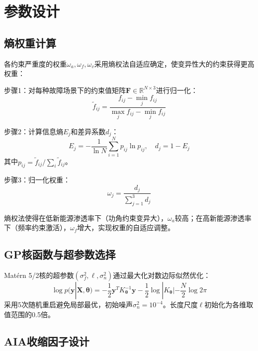 \section{参数设计}
\label{sec:parameters}

\subsection{熵权重计算}

各约束严重度的权重$\omega_a, \omega_f, \omega_v$采用熵权法自适应确定，使变异性大的约束获得更高权重：

步骤1：对每种故障场景下的约束值矩阵$\mathbf{F} \in \mathbb{R}^{N \times 3}$进行归一化：
\begin{equation}
    \tilde{f}_{ij} = \frac{f_{ij} - \min_j f_{ij}}{\max_j f_{ij} - \min_j f_{ij}}
    \label{eq:normalize}
\end{equation}

步骤2：计算信息熵$E_j$和差异系数$d_j$：
\begin{equation}
    E_j = -\frac{1}{\ln N} \sum_{i=1}^N p_{ij} \ln p_{ij}, \quad d_j = 1 - E_j
    \label{eq:entropy}
\end{equation}
其中$p_{ij} = \tilde{f}_{ij} / \sum_i \tilde{f}_{ij}$。

步骤3：归一化权重：
\begin{equation}
    \omega_j = \frac{d_j}{\sum_{j=1}^3 d_j}
    \label{eq:entropy_weight}
\end{equation}

熵权法使得在低新能源渗透率下（功角约束变异大），$\omega_a$较高；在高新能源渗透率下（频率约束激活），$\omega_f$增大，实现权重的自适应调整。

\subsection{GP核函数与超参数选择}

Matérn 5/2核的超参数$(\sigma_f^2, \ell, \sigma_n^2)$通过最大化对数边际似然优化：
\begin{equation}
    \log p(\mathbf{y} | \mathbf{X}, \boldsymbol{\theta}) = -\frac{1}{2}\mathbf{y}^T K_{\boldsymbol{\theta}}^{-1}\mathbf{y} - \frac{1}{2}\log|K_{\boldsymbol{\theta}}| - \frac{N}{2}\log 2\pi
    \label{eq:marginal_likelihood}
\end{equation}
采用5次随机重启避免局部最优，初始噪声$\sigma_n^2 = 10^{-4}$。长度尺度$\ell$初始化为各维取值范围的0.5倍。

\subsection{AIA收缩因子设计}

